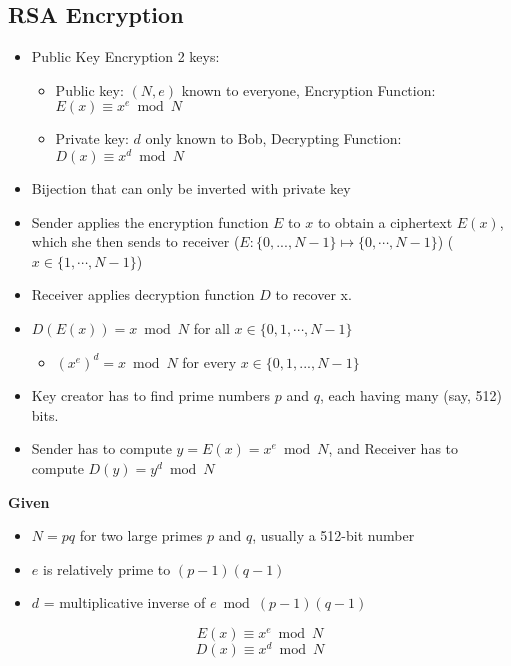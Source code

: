 \documentclass{article}\usepackage{amsmath,amssymb,amsthm,tikz,tkz-graph,color,chngpage,soul,hyperref,csquotes,graphicx,floatrow, listings,polynom}\newcommand*{\QEDB}{\hfill\ensuremath{\square}}\newtheorem*{prop}{Proposition}\renewcommand{\theenumi}{\alph{enumi}}\usepackage[shortlabels]{enumitem}\usepackage[nobreak=true]{mdframed}\usetikzlibrary{matrix,calc}\MakeOuterQuote{"}\usepackage[margin=0.75in]{geometry} \newtheorem{theorem}{Theorem}\newcommand{\Z}{\mathbb Z}\newcommand{\R}{\mathbb R}\newcommand{\Q}{\mathbb Q}\newcommand{\N}{\mathbb N}\newcommand{\x}[1]{\textrm{ #1 }}\newcommand{\pr}{\textrm{Pr}}
\newcommand{\eq}[1]{\begin{equation}#1\end{equation}}
\begin{document}
\subsection*{RSA Encryption}
\begin{itemize}
    \item Public Key Encryption 2 keys:
    \begin{itemize}
        \item Public key: $(N, e)$ known to everyone, Encryption Function: $E(x) \equiv x^e \bmod N$
        \item Private key: $d$ only known to Bob, Decrypting Function: $D(x) \equiv x^d \bmod N$
    \end{itemize}
    \item Bijection that can only be inverted with private key
    \item Sender applies the encryption function $E$ to $x$ to obtain a ciphertext $E(x)$, which she then sends to receiver ($E : \{0,...,N-1\} \mapsto \{0,\cdots,N-1\}$) ($x \in \{1,\cdots,N-1\}$)
    \item Receiver applies decryption function $D$ to recover x.
    \item $D(E(x)) = x \bmod N$ for all $x \in \{0,1,\cdots,N-1\}$
    \begin{itemize}
        \item $(x^e)^d = x \bmod N$ for every $x \in \{0,1,...,N-1\}$
    \end{itemize}
    \item Key creator has to find prime numbers $p$ and $q$, each having many (say, 512) bits.
    \item Sender has to compute $y=E(x)=x^e \bmod N$, and Receiver has to compute $D(y)= y^d \bmod N$
\end{itemize}
\begin{mdframed}
\textbf{Given}
\begin{itemize}
    \item $N = pq$ for two large primes $p$ and $q$, usually a 512-bit number
    \item $e$ is relatively prime to $(p-1)(q-1)$
    \item $d$ = multiplicative inverse of $e \bmod (p-1)(q-1)$
\end{itemize}
\eq{E(x) \equiv x^e \bmod N}
\eq{D(x) \equiv x^d \bmod N}
\end{mdframed}

\pagebreak
\end{document}
